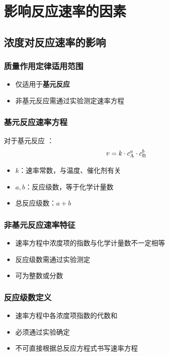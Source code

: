 \section{影响反应速率的因素}
\subsection{浓度对反应速率的影响}
\subsubsection{质量作用定律适用范围}
\begin{itemize}
\item 仅适用于\textbf{基元反应}
\item 非基元反应需通过实验测定速率方程
\end{itemize}

\subsubsection{基元反应速率方程}
对于基元反应 ：
\[
v = k \cdot c_{\ce{A}}^a \cdot c_{\ce{B}}^b
\]
\begin{itemize}
\item $k$：速率常数，与温度、催化剂有关
\item $a, b$：反应级数，等于化学计量数
\item 总反应级数：$a + b$
\end{itemize}

\subsubsection{非基元反应速率特征}
\begin{itemize}
\item 速率方程中浓度项的指数与化学计量数不一定相等
\item 反应级数需通过实验测定
\item 可为整数或分数
\end{itemize}

\subsubsection{反应级数定义}
\begin{itemize}
\item 速率方程中各浓度项指数的代数和
\item 必须通过实验确定
\item 不可直接根据总反应方程式书写速率方程
\end{itemize}

